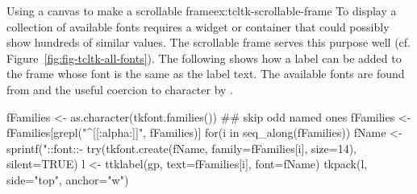 \begin{example}{Using a canvas to make a scrollable frame}{ex:tcltk-scrollable-frame}
To display a collection of available fonts requires a widget or
container that could possibly show hundreds of similar values. The
scrollable frame serves this purpose well
(cf. Figure~\ref{fig:fig-tcltk-all-fonts}).  The following shows how a
label can be added to the frame whose font is the same as the label
text. The available fonts are found from 
and the useful coercion to character by .
\begin{Schunk}
\begin{Sinput}
 fFamilies <- as.character(tkfont.families())
 ## skip odd named ones
 fFamilies <- fFamilies[grepl("^[[:alpha:]]", fFamilies)] 
 for(i in seq_along(fFamilies)) {
   fName <- sprintf("::font::-%
   try(tkfont.create(fName, family=fFamilies[i], size=14), 
       silent=TRUE)
   l <- ttklabel(gp, text=fFamilies[i], font=fName)
   tkpack(l, side="top", anchor="w")
 }
\end{Sinput}
\end{Schunk}

\end{example}

